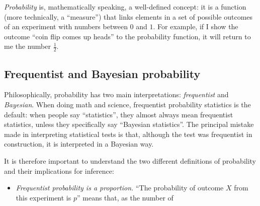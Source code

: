 \emph{Probability} is, mathematically speaking, a well-defined concept: it
is a function (more technically, a ``measure'') that links elements in
a set of possible outcomes of an experiment with numbers between $0$ and
$1$. For example, if I show the outcome ``coin flip comes up heads'' to
the probability function, it will return to me the number $\tfrac{1}{2}$.

\subsection{Frequentist and Bayesian probability}

Philosophically, probability has two main interpretations:
\emph{frequentist} and \emph{Bayesian}. When doing math and science,
frequentist probability statistics is the default: when people say
``statistics'', they almost always mean frequentist statistics, unless
they specifically say ``Bayesian statistics''. The principal mistake made
in interpreting statistical tests is that, although the test was
frequentist in construction, it is interpreted in a Bayesian way.

It is therefore important to understand the two different definitions of
probability and their implications for inference:
\begin{itemize}

\item \emph{Frequentist probability is a proportion.} ``The probability of
outcome $X$ from this experiment is $p$'' means that, as the number of 

\end{itemize}

